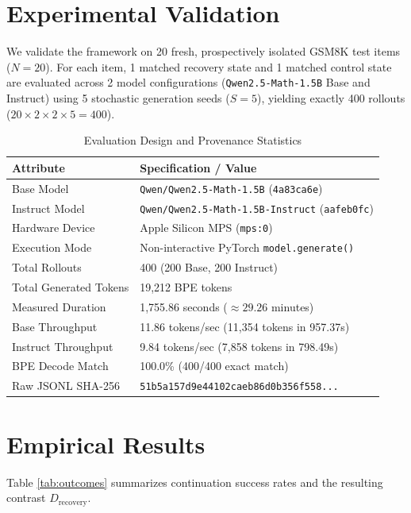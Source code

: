 \documentclass[10pt,conference]{IEEEtran}
\begin{document}
\section{Experimental Validation}
We validate the framework on 20 fresh, prospectively isolated GSM8K test items ($N=20$). For each item, 1 matched recovery state and 1 matched control state are evaluated across 2 model configurations (\texttt{Qwen2.5-Math-1.5B} Base and Instruct) using 5 stochastic generation seeds ($S=5$), yielding exactly 400 rollouts ($20 \times 2 \times 2 \times 5 = 400$).

\begin{table}[htbp]
\caption{Evaluation Design and Provenance Statistics}
\label{tab:provenance}
\centering
\begin{tabular}{lp{5.2cm}}
\toprule
\textbf{Attribute} & \textbf{Specification / Value} \\
\midrule
Base Model & \texttt{Qwen/Qwen2.5-Math-1.5B} (\texttt{4a83ca6e}) \\
Instruct Model & \texttt{Qwen/Qwen2.5-Math-1.5B-Instruct} (\texttt{aafeb0fc}) \\
Hardware Device & Apple Silicon MPS (\texttt{mps:0}) \\
Execution Mode & Non-interactive PyTorch \texttt{model.generate()} \\
Total Rollouts & 400 (200 Base, 200 Instruct) \\
Total Generated Tokens & 19,212 BPE tokens \\
Measured Duration & 1,755.86 seconds ($\approx 29.26$ minutes) \\
Base Throughput & 11.86 tokens/sec (11,354 tokens in 957.37s) \\
Instruct Throughput & 9.84 tokens/sec (7,858 tokens in 798.49s) \\
BPE Decode Match & 100.0\% (400/400 exact match) \\
Raw JSONL SHA-256 & \texttt{51b5a157d9e44102caeb86d0b356f558...} \\
\bottomrule
\end{tabular}
\end{table}

\section{Empirical Results}
Table \ref{tab:outcomes} summarizes continuation success rates and the resulting contrast $D_{\text{recovery}}$.
\end{document}
